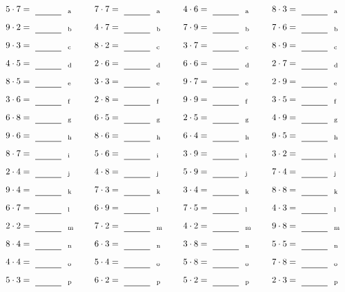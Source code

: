 \documentclass
[
  draft    = true,
  fontsize = 11pt,
  parskip  = half-
]
{scrartcl}
\begin{document}
\par\vfill\par
\begin{align*}
    \pline{5\cdot7}&=\rline{a}
  & \pline{7\cdot7}&=\rline{a}
  & \pline{4\cdot6}&=\rline{a}
  & \pline{8\cdot3}&=\rline{a} \\[1ex]
    \pline{9\cdot2}&=\rline{b}
  & \pline{4\cdot7}&=\rline{b}
  & \pline{7\cdot9}&=\rline{b}
  & \pline{7\cdot6}&=\rline{b} \\[1ex]
    \pline{9\cdot3}&=\rline{c}
  & \pline{8\cdot2}&=\rline{c}
  & \pline{3\cdot7}&=\rline{c}
  & \pline{8\cdot9}&=\rline{c} \\[1ex]
    \pline{4\cdot5}&=\rline{d}
  & \pline{2\cdot6}&=\rline{d}
  & \pline{6\cdot6}&=\rline{d}
  & \pline{2\cdot7}&=\rline{d} \\[1ex]
    \pline{8\cdot5}&=\rline{e}
  & \pline{3\cdot3}&=\rline{e}
  & \pline{9\cdot7}&=\rline{e}
  & \pline{2\cdot9}&=\rline{e} \\[1ex]
    \pline{3\cdot6}&=\rline{f}
  & \pline{2\cdot8}&=\rline{f}
  & \pline{9\cdot9}&=\rline{f}
  & \pline{3\cdot5}&=\rline{f} \\[1ex]
    \pline{6\cdot8}&=\rline{g}
  & \pline{6\cdot5}&=\rline{g}
  & \pline{2\cdot5}&=\rline{g}
  & \pline{4\cdot9}&=\rline{g} \\[1ex]
    \pline{9\cdot6}&=\rline{h}
  & \pline{8\cdot6}&=\rline{h}
  & \pline{6\cdot4}&=\rline{h}
  & \pline{9\cdot5}&=\rline{h} \\[1ex]
    \pline{8\cdot7}&=\rline{i}
  & \pline{5\cdot6}&=\rline{i}
  & \pline{3\cdot9}&=\rline{i}
  & \pline{3\cdot2}&=\rline{i} \\[1ex]
    \pline{2\cdot4}&=\rline{j}
  & \pline{4\cdot8}&=\rline{j}
  & \pline{5\cdot9}&=\rline{j}
  & \pline{7\cdot4}&=\rline{j} \\[1ex]
    \pline{9\cdot4}&=\rline{k}
  & \pline{7\cdot3}&=\rline{k}
  & \pline{3\cdot4}&=\rline{k}
  & \pline{8\cdot8}&=\rline{k} \\[1ex]
    \pline{6\cdot7}&=\rline{l}
  & \pline{6\cdot9}&=\rline{l}
  & \pline{7\cdot5}&=\rline{l}
  & \pline{4\cdot3}&=\rline{l} \\[1ex]
    \pline{2\cdot2}&=\rline{m}
  & \pline{7\cdot2}&=\rline{m}
  & \pline{4\cdot2}&=\rline{m}
  & \pline{9\cdot8}&=\rline{m} \\[1ex]
    \pline{8\cdot4}&=\rline{n}
  & \pline{6\cdot3}&=\rline{n}
  & \pline{3\cdot8}&=\rline{n}
  & \pline{5\cdot5}&=\rline{n} \\[1ex]
    \pline{4\cdot4}&=\rline{o}
  & \pline{5\cdot4}&=\rline{o}
  & \pline{5\cdot8}&=\rline{o}
  & \pline{7\cdot8}&=\rline{o} \\[1ex]
    \pline{5\cdot3}&=\rline{p}
  & \pline{6\cdot2}&=\rline{p}
  & \pline{5\cdot2}&=\rline{p}
  & \pline{2\cdot3}&=\rline{p}
\end{align*}
\end{document}
